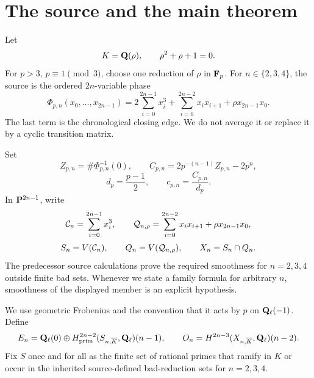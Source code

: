 \section{The source and the main theorem}\label{sec:source}

Let
\[
 K=\mathbf Q(\rho),\qquad \rho^2+\rho+1=0.
\]
For \(p>3\), \(p\equiv1\pmod3\), choose one reduction of \(\rho\) in
\(\mathbf F_p\).  For \(n\in\{2,3,4\}\), the source is the ordered \(2n\)-variable
phase
\begin{equation}\label{eq:phase}
 \Phi_{p,n}(x_0,\ldots,x_{2n-1})
 =2\sum_{i=0}^{2n-1}x_i^3+
   \sum_{i=0}^{2n-2}x_ix_{i+1}+\rho x_{2n-1}x_0.
\end{equation}
The last term is the chronological closing edge.  We do not average it or
replace it by a cyclic transition matrix.

Set
\[
 Z_{p,n}=\#\Phi_{p,n}^{-1}(0),\qquad
 C_{p,n}=2p^{-(n-1)}Z_{p,n}-2p^n,
\]
\begin{equation}\label{eq:normalization}
 d_p=\frac{p-1}{2},\qquad c_{p,n}=\frac{C_{p,n}}{d_p}.
\end{equation}
In \(\mathbf P^{2n-1}\), write
\[
 \mathcal C_n=\sum_{i=0}^{2n-1}x_i^3,\qquad
 \mathcal Q_{n,\rho}=\sum_{i=0}^{2n-2}x_ix_{i+1}
               +\rho x_{2n-1}x_0,
\]
\[
 S_n=V(\mathcal C_n),\qquad Q_n=V(\mathcal Q_{n,\rho}),\qquad
 X_n=S_n\cap Q_n.
\]
The predecessor source calculations prove the required smoothness for
\(n=2,3,4\) outside finite bad sets.  Whenever we state a family formula
for arbitrary \(n\), smoothness of the displayed member is an explicit
hypothesis.

We use geometric Frobenius and the convention that it acts by \(p\) on
\(\mathbf Q_\ell(-1)\).  Define
\begin{equation}\label{eq:packets}
 E_n=\mathbf Q_\ell(0)\oplus
 H^{2n-2}_{\mathrm{prim}}(S_{n,\overline K},\mathbf Q_\ell)(n-1),
 \qquad
 O_n=H^{2n-3}(X_{n,\overline K},\mathbf Q_\ell)(n-2).
\end{equation}
Fix \(S\) once and for all as the finite set of rational primes that
ramify in \(K\) or occur in the inherited source-defined bad-reduction
sets for \(n=2,3,4\).

